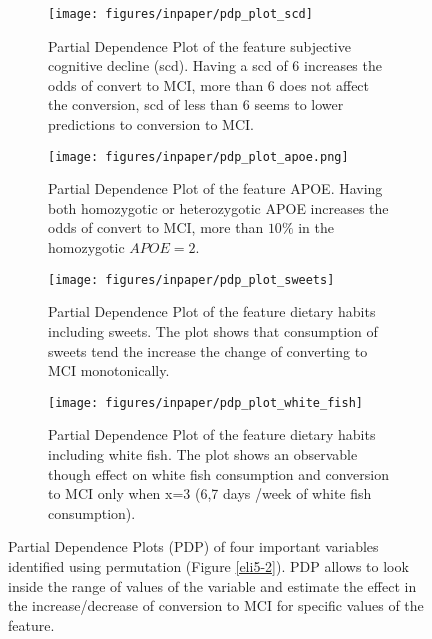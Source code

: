 \documentclass[preprint,12pt]{elsarticle}
\begin{document}
\begin{figure}[]
    \centering
    \begin{subfigure}[t]{0.45\textwidth}
        \centering
        \texttt{[image: figures/inpaper/pdp\_plot\_scd]}
        \caption{Partial Dependence Plot of the feature subjective cognitive decline (scd). Having a scd of 6 increases the odds of convert to MCI, more than 6 does not affect the conversion, scd of less than 6 seems to lower predictions to conversion to MCI.}
    \end{subfigure}
    \hfill
    \begin{subfigure}[t]{0.45\textwidth}
        \centering
        \texttt{[image: figures/inpaper/pdp\_plot\_apoe.png]}
        \caption{Partial Dependence Plot of the feature APOE. Having both homozygotic or heterozygotic APOE increases the odds of convert to MCI, more than $10\%$ in the homozygotic $APOE=2$.}
    \end{subfigure}%
    
    \begin{subfigure}[t]{0.45\textwidth}
        \centering
        \texttt{[image: figures/inpaper/pdp\_plot\_sweets]}
        \caption{Partial Dependence Plot of the feature dietary habits including sweets. The plot shows that consumption of sweets tend the increase the change of converting to MCI monotonically.}
    \end{subfigure}
    \hfill
    \begin{subfigure}[t]{0.45\textwidth}
        \centering
        \texttt{[image: figures/inpaper/pdp\_plot\_white\_fish]}
        \caption{Partial Dependence Plot of the feature dietary habits including white fish. The plot shows an observable though effect on white fish consumption and conversion to MCI only when x=3 (6,7 days /week of white fish consumption).}
    \end{subfigure}%
\caption{Partial Dependence Plots (PDP) of four important variables identified using permutation (Figure \ref{eli5-2}). PDP allows to look inside the range of values of the variable and estimate the effect in the increase/decrease of conversion to MCI for specific values of the feature.}

\end{figure}
\end{document}

